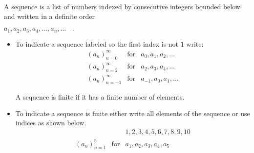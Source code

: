 \begin{frame}
\begin{definition}
A sequence is a list of numbers indexed by consecutive integers bounded below and written in a definite order

\hfil\hfil$a_1, a_2, a_3, a_4, \ldots , a_n , \ldots\quad .$
\end{definition}

\begin{itemize}
\item To indicate a sequence labeled so the first index is not $1$ write:
\[
\begin{array}{rcl}
\left(a_n\right)_{n=0}^{\infty}&\text{for}& a_0, a_1, a_2,\dots \\
\left(a_n\right)_{n=2}^{\infty}&\text{for}& a_2, a_3, a_4,\dots \\
\left(a_n\right)_{n=-1}^{\infty}&\text{for}& a_{-1}, a_0, a_1,\dots
\end{array}
\]
\begin{definition}
A sequence is finite if it has a finite number of elements.
\end{definition}
\item To indicate a sequence is finite either write all elements of the sequence or use indices as shown below.
\[
\begin{array}{rcl}
&&1,2,3,4,5,6,7,8,9,10\\
\left(a_n\right)_{n=1}^{5}&\text{for}& a_1,a_2,a_3,a_4,a_5 
\end{array}
\]
\end{itemize}

\vskip 5cm

\end{frame}
